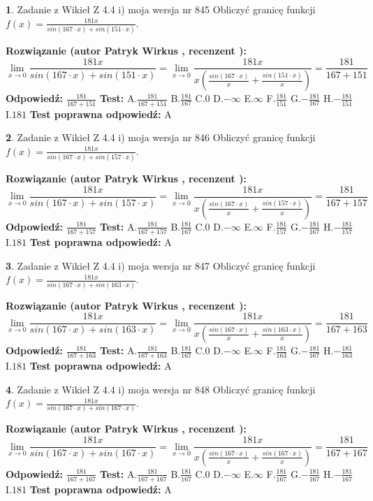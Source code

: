 \documentclass[12pt, a4paper]{article}
\theoremstyle{definition} %
\newtheorem{zad}{}
\newcommand{\zadStart}[1]{\begin{zad}#1\newline}
\newcommand{\zadStop}{\end{zad}}
\newcommand{\rozwStart}[2]{\noindent \textbf{Rozwiązanie (autor #1 , recenzent #2): }\newline}
\newcommand{\rozwStop}{\newline}
\newcommand{\odpStart}{\noindent \textbf{Odpowiedź:}\newline}
\newcommand{\odpStop}{\newline}
\newcommand{\testStart}{\noindent \textbf{Test:}\newline}
\newcommand{\testStop}{\newline}
\newcommand{\kluczStart}{\noindent \textbf{Test poprawna odpowiedź:}\newline}
\newcommand{\kluczStop}{\newline}
\begin{document}
\zadStart{Zadanie z Wikieł Z 4.4 i) moja wersja nr 845}
Obliczyć granicę funkcji $f(x)=\frac{181x}{sin(167\cdot x) +sin(151\cdot x)}$.
\zadStop
\rozwStart{Patryk Wirkus}{}
$$\lim\limits_{x\to 0}\frac{181x}{sin(167\cdot x) +sin(151\cdot x)}=\lim\limits_{x\to 0}\frac{181x}{x(\frac{sin(167\cdot x)}{x}+\frac{sin(151\cdot x)}{x})}=\frac{181}{167+151}$$
\rozwStop
\odpStart
$\frac{181}{167+151}$
\odpStop
\testStart
A.$\frac{181}{167+151}$
B.$\frac{181}{167}$
C.$0$
D.$-\infty$
E.$\infty$
F.$\frac{181}{151}$
G.$-\frac{181}{167}$
H.$-\frac{181}{151}$
I.$181$
\testStop
\kluczStart
A
\kluczStop



\zadStart{Zadanie z Wikieł Z 4.4 i) moja wersja nr 846}
Obliczyć granicę funkcji $f(x)=\frac{181x}{sin(167\cdot x) +sin(157\cdot x)}$.
\zadStop
\rozwStart{Patryk Wirkus}{}
$$\lim\limits_{x\to 0}\frac{181x}{sin(167\cdot x) +sin(157\cdot x)}=\lim\limits_{x\to 0}\frac{181x}{x(\frac{sin(167\cdot x)}{x}+\frac{sin(157\cdot x)}{x})}=\frac{181}{167+157}$$
\rozwStop
\odpStart
$\frac{181}{167+157}$
\odpStop
\testStart
A.$\frac{181}{167+157}$
B.$\frac{181}{167}$
C.$0$
D.$-\infty$
E.$\infty$
F.$\frac{181}{157}$
G.$-\frac{181}{167}$
H.$-\frac{181}{157}$
I.$181$
\testStop
\kluczStart
A
\kluczStop



\zadStart{Zadanie z Wikieł Z 4.4 i) moja wersja nr 847}
Obliczyć granicę funkcji $f(x)=\frac{181x}{sin(167\cdot x) +sin(163\cdot x)}$.
\zadStop
\rozwStart{Patryk Wirkus}{}
$$\lim\limits_{x\to 0}\frac{181x}{sin(167\cdot x) +sin(163\cdot x)}=\lim\limits_{x\to 0}\frac{181x}{x(\frac{sin(167\cdot x)}{x}+\frac{sin(163\cdot x)}{x})}=\frac{181}{167+163}$$
\rozwStop
\odpStart
$\frac{181}{167+163}$
\odpStop
\testStart
A.$\frac{181}{167+163}$
B.$\frac{181}{167}$
C.$0$
D.$-\infty$
E.$\infty$
F.$\frac{181}{163}$
G.$-\frac{181}{167}$
H.$-\frac{181}{163}$
I.$181$
\testStop
\kluczStart
A
\kluczStop



\zadStart{Zadanie z Wikieł Z 4.4 i) moja wersja nr 848}
Obliczyć granicę funkcji $f(x)=\frac{181x}{sin(167\cdot x) +sin(167\cdot x)}$.
\zadStop
\rozwStart{Patryk Wirkus}{}
$$\lim\limits_{x\to 0}\frac{181x}{sin(167\cdot x) +sin(167\cdot x)}=\lim\limits_{x\to 0}\frac{181x}{x(\frac{sin(167\cdot x)}{x}+\frac{sin(167\cdot x)}{x})}=\frac{181}{167+167}$$
\rozwStop
\odpStart
$\frac{181}{167+167}$
\odpStop
\testStart
A.$\frac{181}{167+167}$
B.$\frac{181}{167}$
C.$0$
D.$-\infty$
E.$\infty$
F.$\frac{181}{167}$
G.$-\frac{181}{167}$
H.$-\frac{181}{167}$
I.$181$
\testStop
\kluczStart
A
\kluczStop
\end{document}
